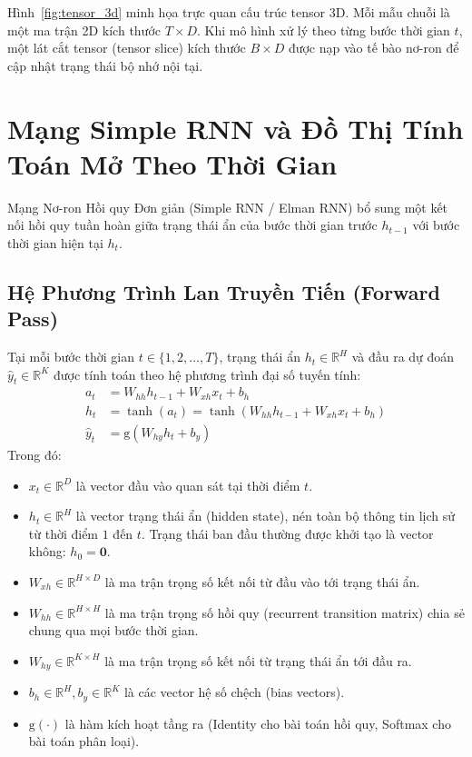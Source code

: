 \documentclass[12pt,a4paper]{report}
\begin{document}
Hình~\ref{fig:tensor_3d} minh họa trực quan cấu trúc tensor 3D. Mỗi mẫu chuỗi là một ma trận 2D kích thước $T \times D$. Khi mô hình xử lý theo từng bước thời gian $t$, một lát cắt tensor (tensor slice) kích thước $B \times D$ được nạp vào tế bào nơ-ron để cập nhật trạng thái bộ nhớ nội tại.

\section{Mạng Simple RNN và Đồ Thị Tính Toán Mở Theo Thời Gian}
Mạng Nơ-ron Hồi quy Đơn giản (Simple RNN / Elman RNN) bổ sung một kết nối hồi quy tuần hoàn giữa trạng thái ẩn của bước thời gian trước $h_{t-1}$ với bước thời gian hiện tại $h_t$.

\subsection{Hệ Phương Trình Lan Truyền Tiến (Forward Pass)}
Tại mỗi bước thời gian $t \in \{1, 2, \dots, T\}$, trạng thái ẩn $h_t \in \mathbb{R}^H$ và đầu ra dự đoán $\hat{y}_t \in \mathbb{R}^K$ được tính toán theo hệ phương trình đại số tuyến tính:
\begin{align}
    a_t &= W_{hh} h_{t-1} + W_{xh} x_t + b_h \label{eq:rnn_preact} \\
    h_t &= \tanh(a_t) = \tanh(W_{hh} h_{t-1} + W_{xh} x_t + b_h) \label{eq:rnn_hidden} \\
    \hat{y}_t &= \text{g}(W_{hy} h_t + b_y) \label{eq:rnn_output}
\end{align}
Trong đó:
\begin{itemize}
    \item $x_t \in \mathbb{R}^D$ là vector đầu vào quan sát tại thời điểm $t$.
    \item $h_t \in \mathbb{R}^H$ là vector trạng thái ẩn (hidden state), nén toàn bộ thông tin lịch sử từ thời điểm $1$ đến $t$. Trạng thái ban đầu thường được khởi tạo là vector không: $h_0 = \mathbf{0}$.
    \item $W_{xh} \in \mathbb{R}^{H \times D}$ là ma trận trọng số kết nối từ đầu vào tới trạng thái ẩn.
    \item $W_{hh} \in \mathbb{R}^{H \times H}$ là ma trận trọng số hồi quy (recurrent transition matrix) chia sẻ chung qua mọi bước thời gian.
    \item $W_{hy} \in \mathbb{R}^{K \times H}$ là ma trận trọng số kết nối từ trạng thái ẩn tới đầu ra.
    \item $b_h \in \mathbb{R}^H, b_y \in \mathbb{R}^K$ là các vector hệ số chệch (bias vectors).
    \item $\text{g}(\cdot)$ là hàm kích hoạt tầng ra (Identity cho bài toán hồi quy, Softmax cho bài toán phân loại).
\end{itemize}
\end{document}
